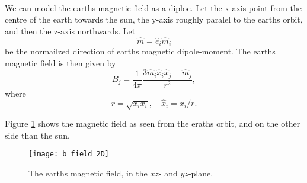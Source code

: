 \documentclass{article}
\begin{document}
    \paragraph{}
    We can model the earths magnetic field as a diploe. Let the x-axis point from the centre of the earth towards the sun, the y-axis roughly paralel to the earths orbit, and then the z-axis northwards. Let
        \begin{equation*}
            \hat m = \hat e_i \hat m_i
        \end{equation*}
        be the normailzed direction of earths magnetic dipole-moment. The earths magnetic field is then given by
        \begin{equation}
            B_j = \frac{1}{4\pi} \frac{3\hat m_i \hat x_i \hat x_j - \hat m_j}{r^2},
        \end{equation}
        where
        \begin{equation*}
            r = \sqrt{x_ix_i}, \quad \hat x_i = x_i / r.
        \end{equation*}

        Figure \ref{B-field} shows the magnetic field as seen from the eraths orbit, and on the other side than the sun. 
        
        \begin{figure}
            \centering    
            \texttt{[image: b\_field\_2D]}
            \caption{The earths magnetic field, in the $xz$- and $yz$-plane.  }
            \label{B-field}
        \end{figure}
\end{document}
